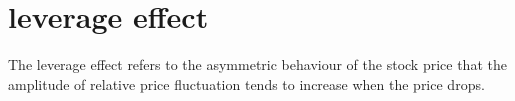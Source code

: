 \section{leverage effect}
The leverage effect refers to the asymmetric behaviour of the stock price that the amplitude of relative price fluctuation tends to increase when the price drops.

